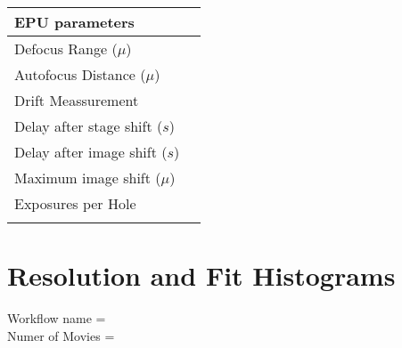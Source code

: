 \documentclass[12pt,a4paper]{article}
\begin{document}
%
  \hspace{1cm}
%
\begin{tabulary}{\linewidth}{L L}
  \\\hline
  EPU parameters &  \\\hline
  Defocus Range ($\mu$)&  \\\hline
  Autofocus Distance ($\mu$) & 
       \\\hline
  Drift Meassurement  &
       \\\hline %
  Delay after stage shift ($s$) & 
       \\\hline
  Delay after image shift ($s$) &
       \\\hline
  Maximum image shift ($\mu$) &
       \\\hline
  Exposures per Hole&
       \\\hline
      &\\
\end{tabulary}

\newpage
\section*{Resolution and Fit Histograms}

Workflow name = \\
Numer of Movies = 
\end{document}
